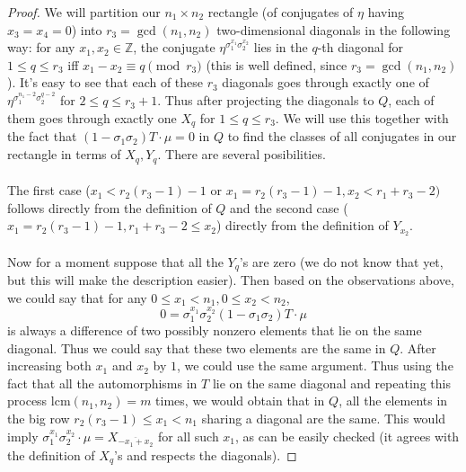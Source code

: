 \documentclass[12pt,a4paper]{article}
\theoremstyle{definition}
\newcommand{\Z}{\mathbb{Z}}
\newcommand{\lcm}{\mathrm{lcm}}
\begin{document}
\begin{proof}

We will partition our $n_1\times n_2$ rectangle (of conjugates of $\eta$ having $x_3=x_4=0$) into $r_3=\gcd(n_1,n_2)$ two-dimensional diagonals in the following way: for any $x_1,x_2\in\Z$, the conjugate $\eta^{\sigma_1^{x_1}\sigma_2^{x_2}}$ lies in the $q$-th diagonal for $1\leq q\leq r_3$ iff $x_1-x_2\equiv q \pmod{r_3}$ (this is well defined, since $r_3=\gcd(n_1,n_2)$). It's easy to see that each of these $r_3$ diagonals goes through exactly one of $\eta^{\sigma_1^{n_1-2}\sigma_2^{q-2}}$ for $2\leq q\leq r_3+1$. %
Thus after projecting the diagonals to $Q$, each of them goes through exactly one $X_q$ for $1\leq q \leq r_3$.
We will use this together with the fact that $(1-\sigma_1\sigma_2)T\cdot \mu=0$ in $Q$ to find the classes of all conjugates in our rectangle in terms of $X_q,Y_q$. There are several posibilities.
 \paragraph*{}
The first case ($x_1<r_2(r_3-1)-1$ or  $x_1=r_2(r_3-1)-1, x_2< r_1+r_3-2)$ follows directly from the definition of $Q$ and the second case ($x_1=r_2(r_3-1)-1, r_1+r_3-2\leq x_2$) directly from the definition of $Y_{x_2}$.
 \paragraph*{}
Now for a moment suppose that all the $Y_q$'s are zero (we do not know that yet, but this will make the description easier). Then based on the observations above, we could say that for any $0\leq x_1< n_1, 0\leq x_2< n_2$, $$0=\sigma_1^{x_1}\sigma_2^{x_2}(1-\sigma_1\sigma_2)T\cdot \mu$$ is always a difference of two possibly nonzero elements %
that lie on the same diagonal. Thus we could say that these two elements are the same in $Q$. After increasing both $x_1$ and $x_2$ by $1$, we could use the same argument. Thus using the fact that all the automorphisms in $T$ lie on the same diagonal and repeating this process $\lcm(n_1,n_2)=m$ times, we would obtain that in $Q$, all the elements in the big row $r_2(r_3-1)\leq x_1<n_1$ sharing a diagonal are the same. This would imply $\sigma_1^{x_1}\sigma_2^{x_2}\cdot \mu=X_{\overline{-x_1+x_2}}$ for all such $x_1$, as can be easily checked (it agrees with the definition of $X_q$'s and respects the diagonals).

\end{proof}
\end{document}
